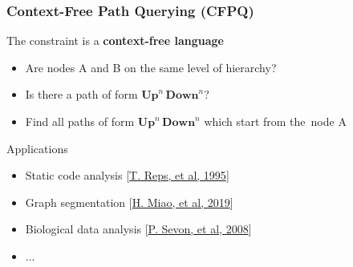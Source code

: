 \documentclass[xcolor=table,aspectratio=169]{beamer}
\begin{document}
\begin{frame}[fragile] \frametitle{Context-Free Path Querying (CFPQ)}
      \begin{minipage}[m]{0.45\linewidth}
  \end{minipage}\hfill
  \begin{minipage}[m]{0.5\linewidth}  
  The constraint is a \textbf{context-free language}
  \begin{itemize}
        \item Are nodes A and B on the same level of hierarchy?
        \item Is there a path of form $\textbf{Up}^n \, \textbf{Down}^n$?
        \item Find all paths of form $\textbf{Up}^n \, \textbf{Down}^n$ which start from the~node A
  \end{itemize}
  \pause
  Applications
    \begin{itemize}
      \item Static code analysis [\href{https://dl.acm.org/doi/10.1145/199448.199462}{T. Reps, et al, 1995}]
      \item Graph segmentation [\href{https://dblp.org/rec/conf/icde/0001D19.html}{H. Miao, et al, 2019}]
      \item Biological data analysis [\href{https://pubmed.ncbi.nlm.nih.gov/20134073/}{P. Sevon, et al, 2008}]
      \item ...      
    \end{itemize}
    
  \end{minipage}

  \end{frame}
\end{document}
